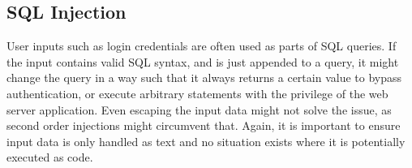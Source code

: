 \subsection{SQL Injection}
User inputs such as login credentials are often used as parts of SQL queries. If
the input contains valid SQL syntax, and is just appended to a query, it might
change the query in a way such that it always returns a certain value to bypass
authentication, or execute arbitrary statements with the privilege of the web
server application. Even escaping the input data might not solve the issue, as
second order injections might circumvent that. Again, it is important to ensure
input data is only handled as text and no situation exists where it is
potentially executed as code.
